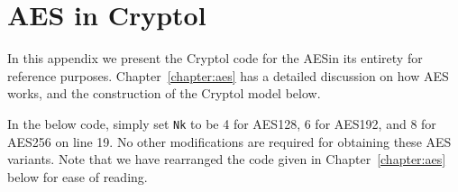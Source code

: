 \chapter{AES in Cryptol}\label{app:aes}

In this appendix we present the Cryptol code for the AES\indAES in its
entirety for reference purposes.  Chapter~\ref{chapter:aes} has a
detailed discussion on how AES works, and the construction of the
Cryptol model below.

In the below code, simply set {\tt Nk} to be 4 for AES128, 6 for
AES192, and 8 for AES256 on line 19. No other modifications are
required for obtaining these AES variants. Note that we have
rearranged the code given in Chapter~\ref{chapter:aes} below for ease
of reading.


